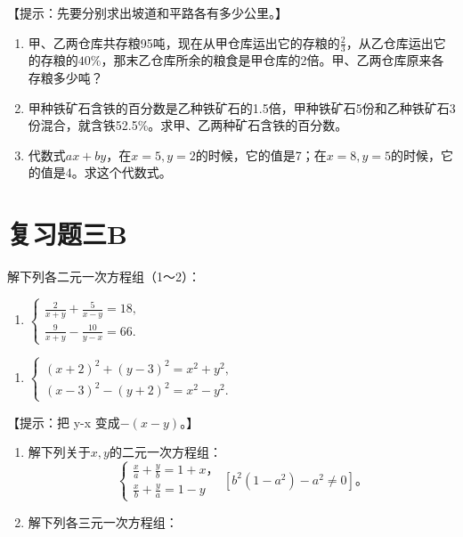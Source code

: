 【提示：先要分别求出坡道和平路各有多少公里。】

\begin{enumerate}[start=12]
\item
  甲、乙两仓库共存粮95吨，现在从甲仓库运出它的存粮的\(\frac{2}{3}\)，从乙仓库运出它的存粮的\(40\%\)，那末乙仓库所余的粮食是甲仓库的2倍。甲、乙两仓库原来各存粮多少吨？
\item
  甲种铁矿石含铁的百分数是乙种铁矿石的1.5倍，甲种铁矿石5份和乙种铁矿石3份混合，就含铁52.5\%。求甲、乙两种矿石含铁的百分数。
\item
  代数式\(ax + by\)，在\(x = 5, y = 2\)的时候，它的值是7；在\(x = 8, y = 5\)的时候，它的值是4。求这个代数式。
\end{enumerate}

\section{复习题三B}

解下列各二元一次方程组（1～2）：

\begin{enumerate}[start=2]
\item
  \(\left\{ \begin{array}{l} \frac{2}{x + y} + \frac{5}{x - y} = 18, \\ \frac{9}{x + y} - \frac{10}{y - x} = 66. \end{array} \right.\)
\end{enumerate}

\begin{enumerate}[start=1]
\item
  \(\left\{ \begin{array}{l} (x + 2)^2 + (y - 3)^2 = x^2 + y^2, \\ (x - 3)^2 - (y + 2)^2 = x^2 - y^2. \end{array} \right.\)
\end{enumerate}

【提示：把 y-x 变成\(-(x-y)\)。】

\begin{enumerate}[start=3]
\item
  解下列关于\(x, y\)的二元一次方程组：
\[
\left\{ \begin{array}{l} \frac{x}{a} + \frac{y}{b} = 1 + x\text{，} \\ \frac{x}{b} + \frac{y}{a} = 1 - y \end{array} \right. [ b ^ {2} (1 - a ^ {2}) - a ^ {2} \neq 0 ]\text{。}
\]
\item
  解下列各三元一次方程组：
\end{enumerate}

